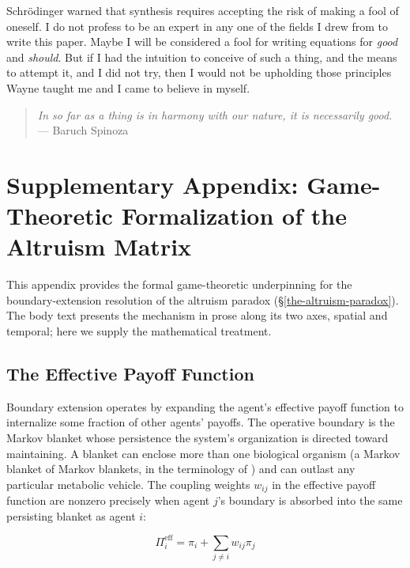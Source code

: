 \documentclass[11pt]{article}
\theoremstyle{plain}
\theoremstyle{definition}
\theoremstyle{remark}
\let\origsection\section
\renewcommand{\section}{\needspace{12\baselineskip}\origsection}
\let\origsubsection\subsection
\renewcommand{\subsection}{\needspace{7\baselineskip}\origsubsection}
\begin{document}
Schrödinger warned that synthesis requires accepting the risk of making
a fool of oneself. I do not profess to be an expert in any one of the
fields I drew from to write this paper. Maybe I will be considered a
fool for writing equations for \emph{good} and \emph{should}. But if I
had the intuition to conceive of such a thing, and the means to attempt
it, and I did not try, then I would not be upholding those principles
Wayne taught me and I came to believe in myself.

\begin{quote}
\emph{In so far as a thing is in harmony with our nature, it is
necessarily good.} --- Baruch Spinoza \citep{Spinoza1677}
\end{quote}

\appendix

\newpage

\section{Supplementary Appendix: Game-Theoretic Formalization of the
Altruism
Matrix}\label{supplementary-appendix-game-theoretic-formalization-of-the-altruism-matrix}

This appendix provides the formal game-theoretic underpinning for the
boundary-extension resolution of the altruism paradox
(§\ref{the-altruism-paradox}). The body text presents the mechanism in
prose along its two axes, spatial and temporal; here we supply the
mathematical treatment.

\subsection{The Effective Payoff
Function}\label{the-effective-payoff-function}

Boundary extension operates by expanding the agent's effective payoff
function to internalize some fraction of other agents' payoffs. The
operative boundary is the Markov blanket
\citep{Pearl2000, KirchhoffFriston2018} whose persistence the system's
organization is directed toward maintaining. A blanket can enclose more
than one biological organism (a Markov blanket of Markov blankets, in
the terminology of \citet{KirchhoffFriston2018}) and can outlast any
particular metabolic vehicle. The coupling weights \(w_{ij}\) in the
effective payoff function are nonzero precisely when agent \(j\)'s
boundary is absorbed into the same persisting blanket as agent \(i\):

\[\Pi_i^{\text{eff}} = \pi_i + \sum_{j \neq i} w_{ij} \pi_j\]
\end{document}
